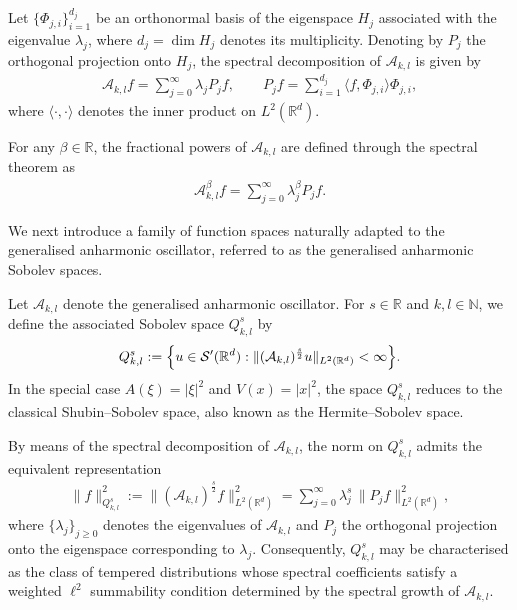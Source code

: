 \documentclass[12pt,reqno,a4paper]{amsart}
\numberwithin{equation}{section}
\theoremstyle{plain}
\theoremstyle{definition}
\theoremstyle{remark}
\begin{document}
Let $\{\Phi_{j,i}\}_{i=1}^{d_j}$ be an orthonormal basis of the eigenspace $H_j$ associated with the eigenvalue $\lambda_j$, where $d_j=\dim H_j$ denotes its multiplicity. Denoting by $P_j$ the orthogonal projection onto $H_j$, the spectral decomposition of $\mathcal{A}_{k,l}$ is given by
\begin{align*}
\mathcal{A}_{k,l}f
=
\sum_{j=0}^{\infty}\lambda_j P_jf,
\qquad
P_jf
=
\sum_{i=1}^{d_j}
\langle f,\Phi_{j,i}\rangle \Phi_{j,i},
\end{align*}
where $\langle\cdot,\cdot\rangle$ denotes the inner product on $L^{2}(\mathbb{R}^{d})$.

For any $\beta\in\mathbb{R}$, the fractional powers of $\mathcal{A}_{k,l}$ are defined through the spectral theorem as
\begin{align*}
\mathcal{A}_{k,l}^{\beta}f
=
\sum_{j=0}^{\infty}
\lambda_j^{\beta}P_jf.
\end{align*}

We next introduce a family of function spaces naturally adapted to the generalised anharmonic oscillator, referred to as the generalised anharmonic Sobolev spaces.

Let $\mathcal{A}_{k,l}$ denote the generalised anharmonic oscillator. For $s\in\mathbb{R}$ and $k,l\in\mathbb{N}$, we define the associated Sobolev space $Q^{s}_{k,l}$ by
\begin{align*}
Q^{s}_{k,l}
:=
\Bigl\{
u\in\mathcal{S}'(\mathbb{R}^{d})
:
\|(\mathcal{A}_{k,l})^{\frac{s}{2}}u\|_{L^{2}(\mathbb{R}^{d})}
<\infty
\Bigr\}.
\end{align*}
In the special case $A(\xi)=|\xi|^{2}$ and $V(x)=|x|^{2}$, the space $Q^{s}_{k,l}$ reduces to the classical Shubin--Sobolev space, also known as the Hermite--Sobolev space.

By means of the spectral decomposition of $\mathcal{A}_{k,l}$, the norm on $Q^{s}_{k,l}$ admits the equivalent representation
\begin{align*}
\|f\|^{2}_{Q^{s}_{k,l}}
:=
\|(\mathcal{A}_{k,l})^{\frac{s}{2}}f\|^{2}_{L^{2}(\mathbb{R}^{d})}
=
\sum_{j=0}^{\infty}
\lambda_{j}^{s}
\,
\|P_{j}f\|^{2}_{L^{2}(\mathbb{R}^{d})},
\end{align*}
where $\{\lambda_j\}_{j\geq 0}$ denotes the eigenvalues of $\mathcal{A}_{k,l}$ and $P_j$ the orthogonal projection onto the eigenspace corresponding to $\lambda_j$. Consequently, $Q^{s}_{k,l}$ may be characterised as the class of tempered distributions whose spectral coefficients satisfy a weighted $\ell^{2}$ summability condition determined by the spectral growth of $\mathcal{A}_{k,l}$.
\end{document}
